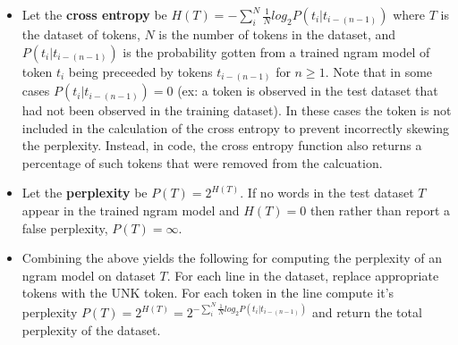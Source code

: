 \begin{itemize}
    \item Let the \textbf{cross entropy} be $H(T) = - \sum_i^N \frac{1}{N} log_2 P \left( t_i \vert t_{i-(n-1)}\right)$ where $T$ is the dataset of tokens, $N$ is the number of tokens in the dataset, and $P \left( t_i \vert t_{i-(n-1)}\right)$ is the probability gotten from a trained ngram model of token $t_i$ being preceeded by tokens $t_{i-(n-1)}$ for $n\geq1$. Note that in some cases $P \left( t_i \vert t_{i-(n-1)}\right) = 0$ (ex: a token is observed in the test dataset that had not been observed in the training dataset). In these cases the token is not included in the calculation of the cross entropy to prevent incorrectly skewing the perplexity. Instead, in code, the cross entropy function also returns a percentage of such tokens that were removed from the calcuation. 
    \item Let the \textbf{perplexity} be $P(T) = 2^{H(T)}$. If no words in the test dataset $T$ appear in the trained ngram model and $H(T) = 0$ then rather than report a false perplexity, $P(T) = \infty$.
    \item Combining the above yields the following for computing the perplexity of an ngram model on dataset $T$. For each line in the dataset, replace appropriate tokens with the UNK token. For each token in the line compute it's perplexity $P(T) = 2^{H(T)} = 2^{- \sum_i^N \frac{1}{N} log_2 P \left( t_i \vert t_{i-(n-1)}\right)}$ and return the total perplexity of the dataset.
\end{itemize}

